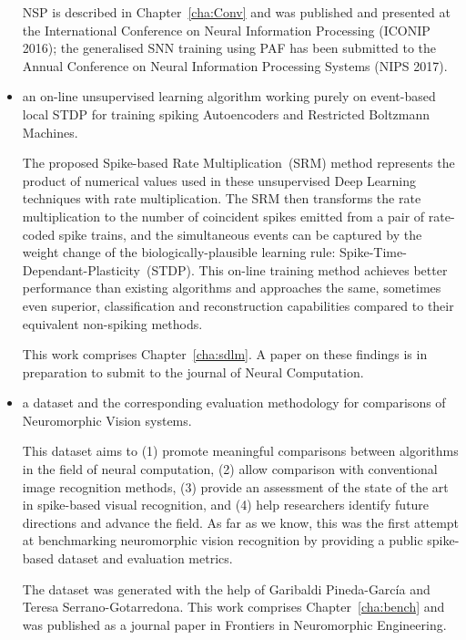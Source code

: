 \begin{itemize}
	NSP is described in Chapter~\ref{cha:Conv} and was published and presented at the International Conference on Neural Information Processing (ICONIP 2016);
	the generalised SNN training using PAF has been submitted to the Annual Conference on Neural Information Processing Systems (NIPS 2017).

	\item 
	an on-line unsupervised learning algorithm working purely on event-based local STDP for training spiking Autoencoders and Restricted Boltzmann Machines.
	
	The proposed Spike-based Rate Multiplication~(SRM) method represents the product of numerical values used in these unsupervised Deep Learning techniques with rate multiplication.
	The SRM then transforms the rate multiplication to the number of coincident spikes emitted from a pair of rate-coded spike trains, and the simultaneous events can be captured by the weight change of the biologically-plausible learning rule: Spike-Time-Dependant-Plasticity~(STDP).
	This on-line training method achieves better performance than existing algorithms and approaches the same, sometimes even superior, classification and reconstruction capabilities compared to their equivalent non-spiking methods.
%	
	
	This work comprises Chapter~\ref{cha:sdlm}.
	A paper on these findings is in preparation to submit to the journal of Neural Computation.
	
	\item 
	a dataset and the corresponding evaluation methodology for comparisons of Neuromorphic Vision systems.
	
	This dataset aims to (1) promote meaningful comparisons between algorithms in the field of neural computation, (2) allow comparison with conventional image recognition methods, (3) provide an assessment of the state of the art in spike-based visual recognition, and (4) help researchers identify future directions and advance the field.
	As far as we know, this was the first attempt at benchmarking neuromorphic vision recognition by providing a public spike-based dataset and evaluation metrics.
	
	The dataset was generated with the help of Garibaldi Pineda-Garc\'ia and Teresa Serrano-Gotarredona.
	This work comprises Chapter~\ref{cha:bench} and was published as a journal paper in Frontiers in Neuromorphic Engineering.
\end{itemize}

